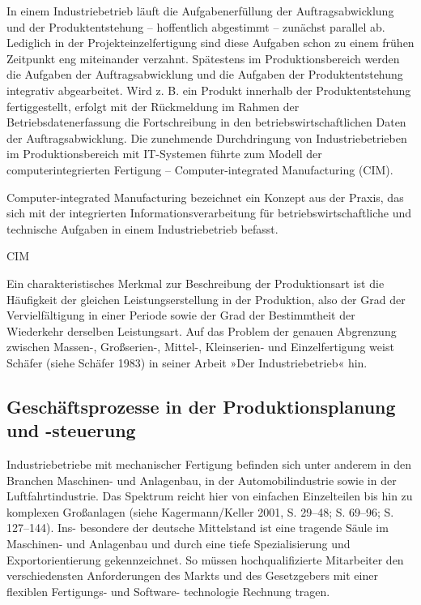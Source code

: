 
In einem Industriebetrieb läuft die Aufgabenerfüllung der Auftragsabwicklung und der Produktentstehung – hoffentlich abgestimmt – zunächst parallel ab. Lediglich in der Projekteinzelfertigung sind diese Aufgaben schon zu einem frühen Zeitpunkt eng miteinander verzahnt. Spätestens im Produktionsbereich werden die Aufgaben der Auftragsabwicklung und die Aufgaben der Produktentstehung integrativ abgearbeitet. Wird z. B. ein Produkt innerhalb der Produktentstehung fertiggestellt, erfolgt mit der Rückmeldung im Rahmen der Betriebsdatenerfassung die Fortschreibung in den betriebswirtschaftlichen Daten der Auftragsabwicklung. Die zunehmende Durchdringung von Industriebetrieben im Produktionsbereich mit IT-Systemen führte zum Modell der computerintegrierten Fertigung – Computer-integrated Manufacturing (CIM).

Computer-integrated Manufacturing bezeichnet ein Konzept aus der Praxis, das sich mit der integrierten Informationsverarbeitung für betriebswirtschaftliche und technische Aufgaben in einem Industriebetrieb befasst. 

\cite{Scheer.1990} CIM

Ein charakteristisches Merkmal zur Beschreibung der Produktionsart ist die Häufigkeit der gleichen Leistungserstellung in der Produktion, also der Grad der Vervielfältigung in einer Periode sowie der Grad der Bestimmtheit der Wiederkehr derselben Leistungsart. Auf das Problem der genauen Abgrenzung zwischen Massen-, Großserien-, Mittel-, Kleinserien- und Einzelfertigung weist Schäfer (siehe Schäfer 1983) in seiner Arbeit »Der Industriebetrieb« hin.


\subsection{Geschäftsprozesse in der Produktionsplanung und -steuerung}

Industriebetriebe mit mechanischer Fertigung befinden sich unter anderem in den Branchen Maschinen- und Anlagenbau, in der Automobilindustrie sowie in der Luftfahrtindustrie. Das Spektrum reicht hier von einfachen Einzelteilen bis hin zu komplexen Großanlagen (siehe Kagermann/Keller 2001, S. 29–48; S. 69–96; S. 127–144). Ins- besondere der deutsche Mittelstand ist eine tragende Säule im Maschinen- und Anlagenbau und durch eine tiefe Spezialisierung und Exportorientierung gekennzeichnet. So müssen hochqualifizierte Mitarbeiter den verschiedensten Anforderungen des Markts und des Gesetzgebers mit einer flexiblen Fertigungs- und Software- technologie Rechnung tragen.

